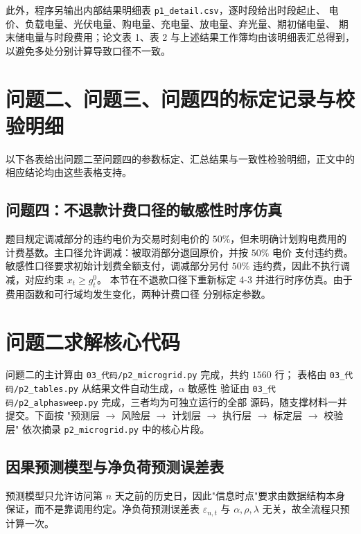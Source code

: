 \documentclass[withoutpreface,bwprint]{cumcmthesis}
\begin{document}
\begin{appendices}
此外，程序另输出内部结果明细表 \texttt{p1\_detail.csv}，逐时段给出时段起止、
电价、负载电量、光伏电量、购电量、充电量、放电量、弃光量、期初储电量、
期末储电量与时段费用；论文表 1、表 2 与上述结果工作簿均由该明细表汇总得到，
以避免多处分别计算导致口径不一致。

\newpage
\section{问题二、问题三、问题四的标定记录与校验明细}

以下各表给出问题二至问题四的参数标定、汇总结果与一致性检验明细，正文中的
相应结论均由这些表格支持。







\subsection{问题四：不退款计费口径的敏感性时序仿真}
\label{app:p4-refund}

题目规定调减部分的违约电价为交易时刻电价的 $50\%$，但未明确计划购电费用的
计费基数。主口径允许调减：被取消部分退回原价，并按 $50\%$ 电价
支付违约费。敏感性口径要求初始计划费全额支付，调减部分另付
$50\%$ 违约费，因此不执行调减，对应约束 $x_t\ge g_t^0$。
本节在不退款口径下重新标定 4-3
并进行时序仿真。由于费用函数和可行域均发生变化，两种计费口径
分别标定参数。



\newpage
\section{问题二求解核心代码}

问题二的主计算由 \texttt{03\_代码/p2\_microgrid.py} 完成，共约 $1560$ 行；
表格由 \texttt{03\_代码/p2\_tables.py} 从结果文件自动生成，$\alpha$ 敏感性
验证由 \texttt{03\_代码/p2\_alphasweep.py} 完成，三者均为可独立运行的全部
源码，随支撑材料一并提交。下面按
"预测层 $\to$ 风险层 $\to$ 计划层 $\to$ 执行层 $\to$ 标定层 $\to$ 校验层"
依次摘录 \texttt{p2\_microgrid.py} 中的核心片段。

\subsection{因果预测模型与净负荷预测误差表}

预测模型只允许访问第 $n$ 天之前的历史日，因此"信息时点"要求由数据结构本身
保证，而不是靠调用约定。净负荷预测误差表 $\varepsilon_{n,t}$ 与
$\alpha,\rho,\lambda$ 无关，故全流程只预计算一次。


\end{appendices}
\end{document}
